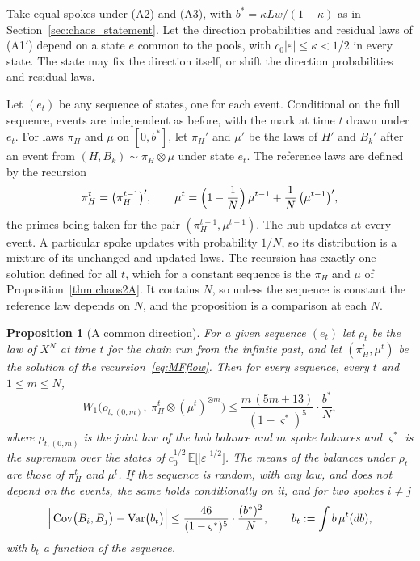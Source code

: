 \documentclass[11pt,a4paper]{article}
\theoremstyle{siphon}
\newtheorem{proposition}{Proposition}
\begin{document}
Take equal spokes under (A2) and (A3), with $b^* = \kappa Lw/(1 - \kappa)$ as in Section~\ref{sec:chaos_statement}. Let the direction probabilities and residual laws of (A1$'$) depend on a state $e$ common to the pools, with $c_0|\varepsilon| \leq \kappa < 1/2$ in every state. The state may fix the direction itself, or shift the direction probabilities and residual laws.

Let $(e_t)$ be any sequence of states, one for each event. Conditional on the full sequence, events are independent as before, with the mark at time $t$ drawn under $e_t$. For laws $\pi_H$ and $\mu$ on $[0, b^*]$, let $\pi_H'$ and $\mu'$ be the laws of $H'$ and $B_k'$ after an event from $(H, B_k) \sim \pi_H \otimes \mu$ under state $e_t$. The reference laws are defined by the recursion
\begin{equation}\label{eq:MFflow}
\pi_H^t  =  \bigl(\pi_H^{t-1}\bigr)' , \qquad \mu^t  =  \Bigl(1 - \frac{1}{N}\Bigr)\,\mu^{t-1} + \frac{1}{N}\,\bigl(\mu^{t-1}\bigr)' ,
\end{equation}
the primes being taken for the pair $(\pi_H^{t-1}, \mu^{t-1})$. The hub updates at every event. A particular spoke updates with probability $1/N$, so its distribution is a mixture of its unchanged and updated laws. The recursion has exactly one solution defined for all $t$, which for a constant sequence is the $\pi_H$ and $\mu$ of Proposition~\ref{thm:chaos2A}. It contains $N$, so unless the sequence is constant the reference law depends on $N$, and the proposition is a comparison at each $N$.

\begin{proposition}[A common direction]\label{prop:commondir}
For a given sequence $(e_t)$ let $\rho_t$ be the law of $X^N$ at time $t$ for the chain run from the infinite past, and let $(\pi_H^t, \mu^t)$ be the solution of the recursion~\eqref{eq:MFflow}. Then for every sequence, every $t$ and $1 \leq m \leq N$,
\[
W_1\bigl(\rho_{t,(0,m)},\ \pi_H^t \otimes (\mu^t)^{\otimes m}\bigr)  \leq  \frac{m\,(5m + 13)}{(1 - \varsigma^*)^5}\cdot\frac{b^*}{N} ,
\]
where $\rho_{t,(0,m)}$ is the joint law of the hub balance and $m$ spoke balances and $\varsigma^*$ is the supremum over the states of $c_0^{1/2}\,\mathbb{E}\bigl[|\varepsilon|^{1/2}\bigr]$. The means of the balances under $\rho_t$ are those of $\pi_H^t$ and $\mu^t$. If the sequence is random, with any law, and does not depend on the events, the same holds conditionally on it, and for two spokes $i \neq j$
\[
\Bigl|\,\operatorname{Cov}\bigl(B_i, B_j\bigr) - \operatorname{Var}\bigl(\bar b_t\bigr)\Bigr|  \leq  \frac{46}{(1 - \varsigma^*)^5}\cdot\frac{(b^*)^2}{N} , \qquad \bar b_t := \int b\,\mu^t(db) ,
\]
with $\bar b_t$ a function of the sequence.
\end{proposition}
\end{document}
